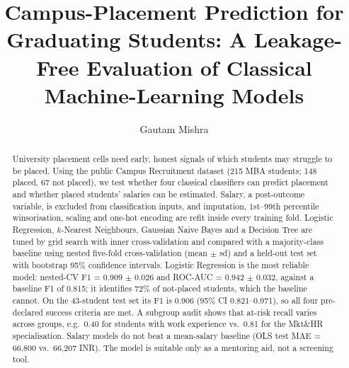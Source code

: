 \documentclass[runningheads]{llncs}
\begin{document}
\title{Campus-Placement Prediction for Graduating Students: A Leakage-Free Evaluation of Classical Machine-Learning Models}
\author{Gautam Mishra}

\maketitle

\begin{abstract}
University placement cells need early, honest signals of which students may struggle to be placed. Using the public Campus Recruitment dataset (215 MBA students; 148 placed, 67 not placed), we test whether four classical classifiers can predict placement and whether placed students' salaries can be estimated. Salary, a post-outcome variable, is excluded from classification inputs, and imputation, 1st--99th percentile winsorisation, scaling and one-hot encoding are refit inside every training fold. Logistic Regression, $k$-Nearest Neighbours, Gaussian Naive Bayes and a Decision Tree are tuned by grid search with inner cross-validation and compared with a majority-class baseline using nested five-fold cross-validation (mean $\pm$ sd) and a held-out test set with bootstrap 95\% confidence intervals. Logistic Regression is the most reliable model: nested-CV F1 = 0.909 $\pm$ 0.026 and ROC-AUC = 0.942 $\pm$ 0.032, against a baseline F1 of 0.815; it identifies 72\% of not-placed students, which the baseline cannot. On the 43-student test set its F1 is 0.906 (95\% CI 0.821--0.971), so all four pre-declared success criteria are met. A subgroup audit shows that at-risk recall varies across groups, e.g.\ 0.40 for students with work experience vs.\ 0.81 for the Mkt\&HR specialisation. Salary models do not beat a mean-salary baseline (OLS test MAE = 66{,}800 vs.\ 66{,}207 INR). The model is suitable only as a mentoring aid, not a screening tool.
\end{abstract}
\end{document}
